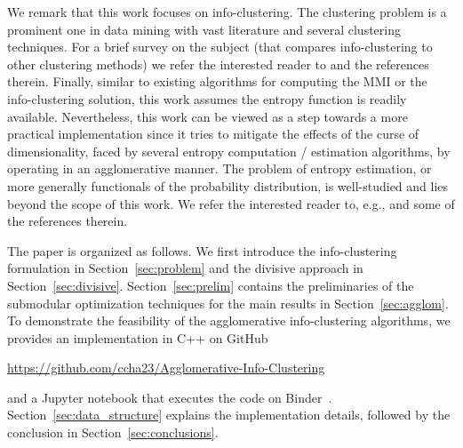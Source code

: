 We remark that this work focuses on info-clustering. The clustering problem is a prominent
one in data mining with vast literature and several clustering techniques. For a brief survey
on the subject (that compares info-clustering to other clustering methods) we refer the interested
reader to \cite{chan16cluster} and the references therein.
Finally, similar to existing algorithms for computing the MMI or the info-clustering solution, this work
assumes the entropy function is readily available. Nevertheless, this work can be viewed as a step towards
a more practical implementation since it tries to mitigate the effects of the curse of dimensionality, faced by several entropy
computation / estimation algorithms, by operating in an agglomerative manner. 
The problem of entropy estimation, or more generally functionals of the probability distribution,
is well-studied and lies beyond the scope of this work. We refer the interested reader to, e.g.,
\cite{kozachenko1987sample, paninski2003estimation, valiant2013estimating, wu16} and some of the references therein. 

The paper is organized as follows. We first introduce the info-clustering formulation in Section~\ref{sec:problem} and the divisive approach in Section~\ref{sec:divisive}. Section~\ref{sec:prelim} contains the preliminaries of the submodular optimization techniques for the main results in Section~\ref{sec:agglom}. To demonstrate the feasibility of the agglomerative info-clustering algorithms, we provides an implementation in C++ on GitHub
\begin{center}
	\url{https://github.com/ccha23/Agglomerative-Info-Clustering}
\end{center}
and a Jupyter notebook that executes the code on Binder~\cite{jupyter2018binder}.
Section~\ref{sec:data_structure} explains the implementation details, followed by the conclusion in Section~\ref{sec:conclusions}.